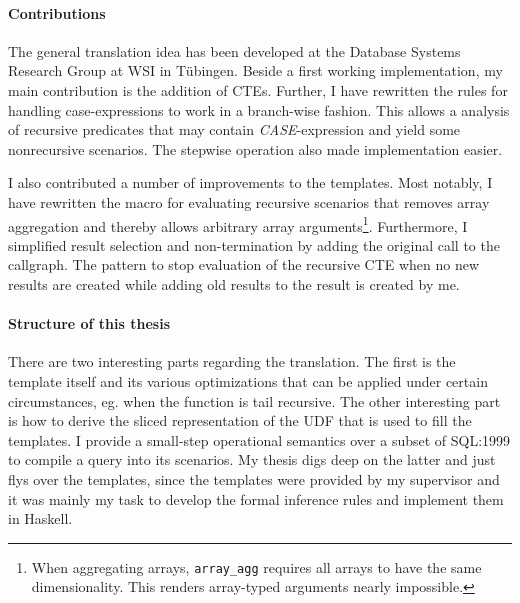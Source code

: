\paragraph*{Contributions} The general translation idea has been developed at the Database Systems Research Group at WSI in Tübingen. Beside a first working implementation, my main contribution is the addition of CTEs. Further, I have rewritten the rules for handling case-expressions to work in a branch-wise fashion. This allows a analysis of recursive predicates that may contain \textit{CASE}-expression and yield some nonrecursive scenarios. The stepwise operation also made implementation easier.

I also contributed a number of improvements to the templates. Most notably, I have rewritten the macro for evaluating recursive scenarios that removes array aggregation and thereby allows arbitrary array arguments\footnote{When aggregating arrays, \texttt{array\_agg} requires all arrays to have the same dimensionality. This renders array-typed arguments nearly impossible.}. Furthermore, I simplified result selection and non-termination by adding the original call to the callgraph. The pattern to stop evaluation of the recursive CTE when no new results are created while adding old results to the result is created by me.

\paragraph*{Structure of this thesis}
There are two interesting parts regarding the translation. The first is the template itself and its various optimizations that can be applied under certain circumstances, eg. when the function is tail recursive. The other interesting part is how to derive the sliced representation of the UDF that is used to fill the templates. I provide a small-step operational semantics over a subset of SQL:1999 to compile a query into its scenarios.
My thesis digs deep on the latter and just flys over the templates, since the templates were provided by my supervisor and it was mainly my task to develop the formal inference rules and implement them in Haskell.



